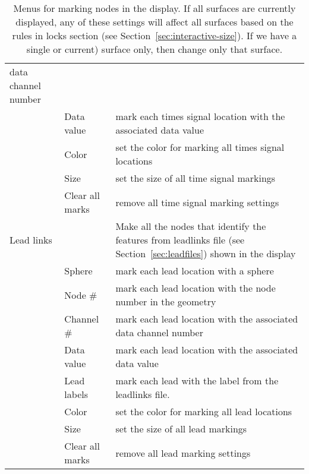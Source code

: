 \begin{table}[ht]
\begin{center}
\begin{tabular}{|l|l|p{4 in}|}
    data channel number \\ 
    &  Data value & mark each times signal location with the associated
    data value \\ 
    &  Color & set the color for marking all times signal locations \\
    &  Size & set the size of all time signal markings \\
   &  Clear all marks & remove all time signal marking settings \\ 
    \hline
    Lead links & & Make all the nodes that identify the features from
    leadlinks file 
       (see Section~\ref{sec:leadfiles}) shown in the display  \\
    &  Sphere & mark each lead location with a sphere \\
    &  Node \# & mark each lead location with the node number in
    the geometry \\ 
    &  Channel \# & mark each lead location with the associated
    data channel number \\ 
    &  Data value & mark each lead location with the associated
    data value \\ 
    &  Lead labels & mark each lead with the label from the leadlinks file.\\
    &  Color & set the color for marking all lead locations \\
    &  Size & set the size of all lead markings \\
   &  Clear all marks & remove all lead marking settings \\ 
    \hline
    \end{tabular}
  \end{center}
\caption{\label{table:nodemarking} Menus for marking nodes in the display.
If all surfaces are currently displayed, any of these settings will affect
all surfaces based on the rules in locks section (see Section~\ref{sec:interactive-size}).  If we have a single 
or current) surface only, then change only that surface.}
\end{table}

